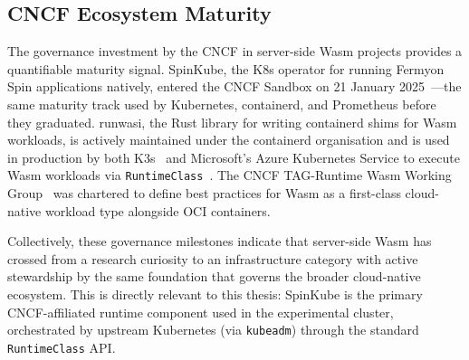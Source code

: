 \subsection{CNCF Ecosystem Maturity}

\begin{sloppypar}
The governance investment by the \acs{CNCF} in server-side \acs{Wasm} projects provides a quantifiable maturity signal. SpinKube, the \acs{K8s} operator for running Fermyon Spin applications natively, entered the \acs{CNCF} Sandbox on 21 January 2025~\cite{spinkube2024}---the same maturity track used by Kubernetes, containerd, and Prometheus before they graduated. runwasi, the Rust library for writing containerd shims for \acs{Wasm} workloads, is actively maintained under the containerd organisation and is used in production by both K3s~\cite{k3s2024rancher} and Microsoft's Azure Kubernetes Service to execute \acs{Wasm} workloads via \texttt{RuntimeClass}~\cite{runwasi2024}. The \acs{CNCF} TAG-Runtime \acs{Wasm} Working Group~\cite{cncf2024tagruntime} was chartered to define best practices for \acs{Wasm} as a first-class cloud-native workload type alongside \acs{OCI} containers.
\end{sloppypar}

\begin{sloppypar}
Collectively, these governance milestones indicate that server-side \acs{Wasm} has crossed from a research curiosity to an infrastructure category with active stewardship by the same foundation that governs the broader cloud-native ecosystem. This is directly relevant to this thesis: SpinKube is the primary \acs{CNCF}-affiliated runtime component used in the experimental cluster, orchestrated by upstream Kubernetes (via \texttt{kubeadm}) through the standard \texttt{RuntimeClass} \acs{API}.
\end{sloppypar}
